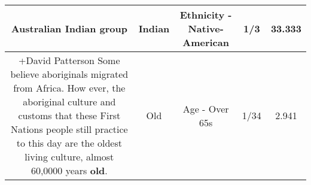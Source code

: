 \documentclass[11pt]{article}
\newlength\mylength
\begin{document}
\begin{center}
\begin{longtable}{|C{.65\mylength}|C{.30\mylength}|C{.12\mylength}|C{.12\mylength}|C{.12\mylength}|}
  \small Australian \textbf{Indian} group\normalsize   & Indian & Ethnicity - Native-American & 1/3 & 33.333 \\  \hline
  \small +David Patterson Some believe aboriginals migrated from Africa. How ever, the aboriginal culture and customs that these First Nations people still practice to this day are the oldest living culture, almost 60,0000 years \textbf{old}.\normalsize   & Old & Age - Over 65s & 1/34 & 2.941 \\  \hline
  
\end{longtable}
\end{center}
\end{document}
